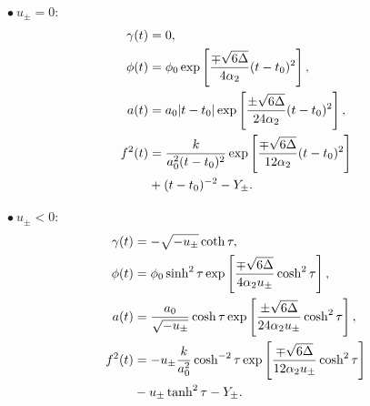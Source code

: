 \documentclass[aps,prd,12pt,superscriptaddress,showpacs,showkeys,longbibliography,reprint,nofootinbib]{revtex4-1}
\begin{document}
$\bullet\ u_\pm=0$:
\begin{align}
  \gamma(t)&=0,\\
  \phi(t)&=\phi_0\exp\left[\frac{\mp\sqrt{6\Delta}}{4\alpha_2}(t-t_0)^2\right],\\
  a(t)&=a_0|t-t_0|\exp\left[\frac{\pm\sqrt{6\Delta}} {24\alpha_2}(t-t_0)^2\right],\\
  f^2(t)&=\frac{k}{a_0^2(t-t_0)^2}\exp\left[\frac{\mp\sqrt{6\Delta}}{12\alpha_2}(t-t_0)^2\right]\notag\\
  &+(t-t_0)^{-2}-Y_\pm.
\end{align}

$\bullet\ u_\pm<0$:
\begin{align}
  \gamma(t)&=-\sqrt{-u_\pm}\coth\tau,\\
  \phi(t)&=\phi_0\sinh^2\tau\exp\left[\frac{\mp\sqrt{6\Delta}}{4\alpha_2u_\pm}\cosh^2\tau\right],\\
  a(t)&=\frac{a_0}{\sqrt{-u_\pm}}\cosh\tau\exp\left[\frac{\pm\sqrt{6\Delta}} {24\alpha_2u_\pm}\cosh^2\tau\right],\\
  f^2(t)&=-u_\pm\frac{k}{a_0^2}\cosh^{-2}\tau\exp\left[\frac{\mp\sqrt{6\Delta}}{12\alpha_2u_\pm}\cosh^2\tau\right]\notag\\
  &-u_\pm\tanh^2\tau-Y_\pm.
\end{align}

\end{document}
